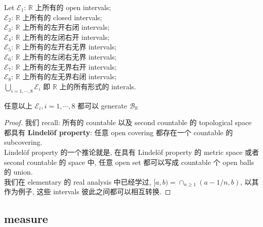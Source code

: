\documentclass{qlnotes-export}
\begin{document}
\begin{example}\label{ex-01-sigma-algebra-measure-example-002}

Let \(\mathcal{E}_{1}\): \(\mathbb{R}\) 上所有的 open intervals;\\
\(\mathcal{E}_{2}\): \(\mathbb{R}\) 上所有的 closed intervals;\\
\(\mathcal{E}_{3}\): \(\mathbb{R}\) 上所有的左开右闭 intervals;\\
\(\mathcal{E}_{4}\): \(\mathbb{R}\) 上所有的左闭右开 intervals;\\
\(\mathcal{E}_{5}\): \(\mathbb{R}\) 上所有的左开右无界 intervals;\\
\(\mathcal{E}_{6}\): \(\mathbb{R}\) 上所有的左闭右无界 intervals;\\
\(\mathcal{E}_{7}\): \(\mathbb{R}\) 上所有的左无界右开 intervals;\\
\(\mathcal{E}_{8}\): \(\mathbb{R}\) 上所有的左无界右闭 intervals;\\
\(\bigcup_{i = 1,\cdots,8}\mathcal{E}_{i}\) 即 \(\mathbb{R}\) 上的所有形式的 interals.

\begin{lemma}\label{lem-01-sigma-algebra-measure-lemma-003}

任意以上 \(\mathcal{E}_{i},i = 1,\cdots,8\) 都可以 generate \(\mathcal{B}_{\mathbb{R}}\)

\end{lemma}

\end{example}

\begin{proof}

我们 recall: 所有的 countable 以及 second countable 的 topological space 都具有 \textbf{Lindelöf property}: 任意 open covering 都存在一个 countable 的 subcovering.\\
Lindelöf property 的一个推论就是, 在具有 Lindelöf property 的 metric space 或者 second countable 的 space 中, 任意 open set 都可以写成 countable 个 open balls 的 union.\\
我们在 elementary 的 real analysis 中已经学过, \(\lbrack a,b) = \cap_{n \geq 1}(a - 1/n,b)\), 以其作为例子, 这些 intervals 彼此之间都可以相互转换.

\end{proof}

\subsection{measure}\label{measure}
\end{document}
